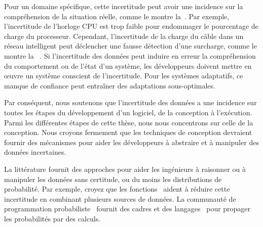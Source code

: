 %
Pour un domaine spécifique, cette incertitude peut avoir une incidence sur la compréhension de la situation réelle, comme le montre la~. 
Par exemple, l'incertitude de l'horloge CPU est trop faible pour endommager le pourcentage de charge du processeur. 
Cependant, l'incertitude de la charge du câble dans un réseau intelligent peut déclencher une fausse détection d'une surcharge, comme le montre la ~. 
Si l'incertitude des données peut induire en erreur la compréhension du comportement ou de l'état d'un système, les développeurs doivent mettre en œuvre un système conscient de l'incertitude. 
Pour les systèmes adaptatifs, ce manque de confiance peut entraîner des adaptations sous-optimales.

%
Par conséquent, nous soutenons que l'incertitude des données a une incidence sur toutes les étapes du développement d'un logiciel, de la conception à l'exécution.
Parmi les différentes étapes de cette thèse, nous nous concentrons sur celle de la conception.
Nous croyons fermement que les techniques de conception devraient fournir des mécanismes pour aider les développeurs à abstraire et à manipuler des données incertaines.

%
La littérature fournit des approches pour aider les ingénieurs à raisonner ou à manipuler les données sans certitude, ou du moins les distributions de probabilité.
Par exemple, croyez que les fonctions~\cite{shafer1992dempster} aident à réduire cette incertitude en combinant plusieurs sources de données.
La communauté de programmation probabiliste~\cite{DBLP:conf/icse/GordonHNR14} fournit des cadres et des langages~\cite{url:InferNET18, baudin2017openturns} pour propager les probabilités par des calculs.

